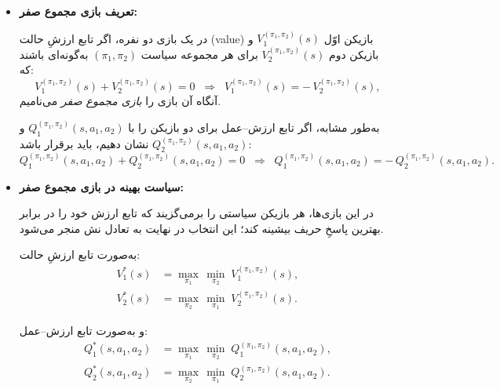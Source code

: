 \begin{itemize}
	\item \textbf{تعریف بازی مجموع صفر:}
	
	در یک بازی دو نفره، اگر تابع ارزشِ حالت (value) بازیکن اوّل 
	\(V_1^{(\pi_1 ,\pi_2)}(s)\)
	و بازیکن دوم 
	\(V_2^{(\pi_1 ,\pi_2)}(s)\)
	برای هر مجموعه سیاست 
	\((\pi_1,\pi_2)\)
	به‌گونه‌ای باشند که:
	\begin{equation}\label{eq:game_v}
		V_1^{(\pi_1 ,\pi_2)}(s) + V_2^{(\pi_1 ,\pi_2)}(s) = 0 
		\;\;\Longrightarrow\;\;
		V_1^{(\pi_1 ,\pi_2)}(s) = -\,V_2^{(\pi_1 ,\pi_2)}(s),
	\end{equation}
	آنگاه آن بازی را \emph{بازی مجموع صفر} می‌نامیم.
	
	به‌طور مشابه، اگر تابع ارزش–عمل برای دو بازیکن را با
	\(Q_1^{(\pi_1,\pi_2)}(s,a_1,a_2)\)
	و
	\(Q_2^{(\pi_1,\pi_2)}(s,a_1,a_2)\)
	نشان دهیم، باید برقرار باشد:
	\begin{equation}\label{eq:game_q}
		Q_1^{(\pi_1,\pi_2)}(s,a_1,a_2) + 
		Q_2^{(\pi_1,\pi_2)}(s,a_1,a_2) = 0
		\;\;\Longrightarrow\;\;
		Q_1^{(\pi_1,\pi_2)}(s,a_1,a_2) = -\,Q_2^{(\pi_1,\pi_2)}(s,a_1,a_2).
	\end{equation}
	
	\item \textbf{سیاست بهینه در بازی مجموع صفر:}
	
	در این بازی‌ها، هر بازیکن سیاستی را برمی‌گزیند که تابع ارزش خود را
	در برابر بهترین پاسخِ حریف بیشینه کند؛ این انتخاب در نهایت به
	تعادل نش منجر می‌شود.
	
	به‌صورت تابع ارزشِ حالت:
	\begin{align}
		V_1^*(s) &= \max_{\pi_1}\,\min_{\pi_2} \;
		V_1^{(\pi_1 ,\pi_2)}(s), \\
		V_2^*(s) &= \max_{\pi_2}\,\min_{\pi_1} \;
		V_2^{(\pi_1 ,\pi_2)}(s).
	\end{align}
	
	و به‌صورت تابع ارزش–عمل:
	\begin{align}
		Q_1^*(s,a_1,a_2) &= \max_{\pi_1}\,\min_{\pi_2} \;
		Q_1^{(\pi_1 ,\pi_2)}(s,a_1,a_2), \\
		Q_2^*(s,a_1,a_2) &= \max_{\pi_2}\,\min_{\pi_1} \;
		Q_2^{(\pi_1 ,\pi_2)}(s,a_1,a_2).
	\end{align}
\end{itemize}


